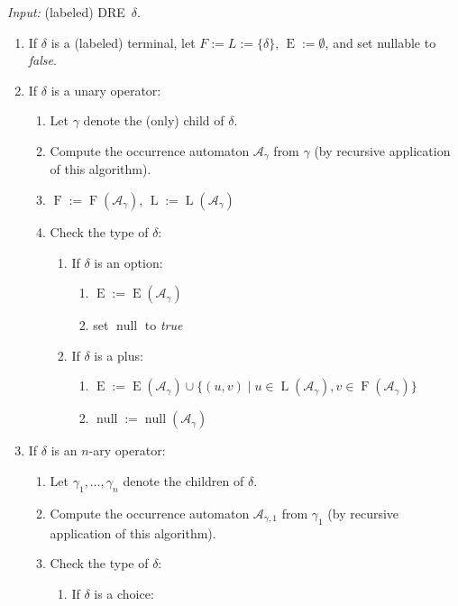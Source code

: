 \documentclass[a4paper,11pt, svgnames,titlepage]{article}
\newcommand{\df}{:=}
\DeclareMathOperator{\first}{F}
\DeclareMathOperator{\last}{L}
\DeclareMathOperator{\follow}{E}
\DeclareMathOperator{\nullable}{null}
\begin{document}
\emph{Input:} (labeled) DRE~$\delta$.
\begin{enumerate}
	\item If $\delta$ is a (labeled) terminal, let $F\df L\df \{\delta\}$, $\follow\df\emptyset$, and set nullable to \emph{false}.
	\item If $\delta$ is a unary operator:
	\begin{enumerate}[label*=\arabic*.]
		\item Let $\gamma$ denote the (only) child of $\delta$.
		\item Compute the occurrence automaton $\mathcal{A}_{\gamma}$ from $\gamma$ (by recursive application of this algorithm).
		\item $\first\df \first(\mathcal{A}_{\gamma})$, $\last\df \last(\mathcal{A}_{\gamma})$
		\item Check the type of $\delta$:
		\begin{enumerate}[label*=\arabic*.]
			\item If $\delta$ is an option: 
			\begin{enumerate}[label*=\arabic*.]
				\item $\follow\df \follow(\mathcal{A}_{\gamma})$
				\item set $\nullable$ to \emph{true}
			\end{enumerate}
			\item If $\delta$ is a plus:
			\begin{enumerate}[label*=\arabic*.]
				\item $\follow\df \follow(\mathcal{A}_{\gamma})\cup \{(u,v)\mid u\in\last(\mathcal{A}_{\gamma}), v\in\first(\mathcal{A}_{\gamma})\}$
				\item $\nullable\df\nullable(\mathcal{A}_{\gamma})$
			\end{enumerate}
		\end{enumerate}
	\end{enumerate}
	\item If $\delta$ is an $n$-ary operator:
	\begin{enumerate}[label*=\arabic*.]
	 	\item Let $\gamma_1,\ldots,\gamma_n$ denote the children of $\delta$.
		\item Compute the occurrence automaton $\mathcal{A}_{\gamma,1}$ from $\gamma_1$ (by recursive application of this algorithm).
		\item Check the type of $\delta$:
		\begin{enumerate}[label*=\arabic*.]
			\item If $\delta$ is a choice:

\end{enumerate}
\end{enumerate}
\end{enumerate}
\end{document}
